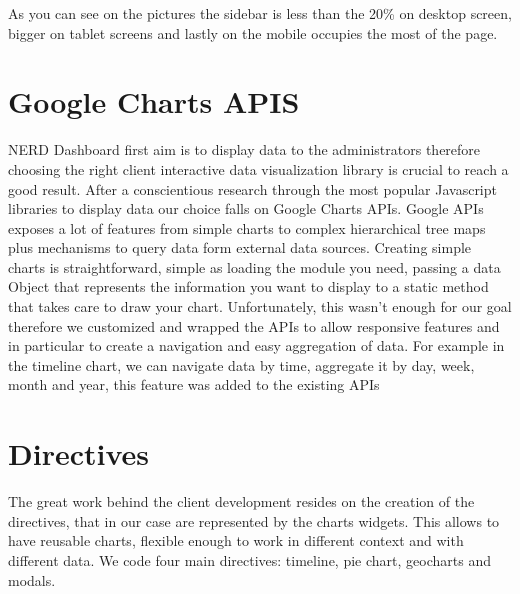 \documentclass[a4paper,13pt]{report}
\begin{document}
As you can see on the pictures the sidebar is less than the 20\% on desktop screen, bigger on tablet screens and lastly on the mobile occupies the most of the page.
\section{Google Charts APIS}
NERD Dashboard first aim is to display data to the administrators therefore choosing the right client interactive data visualization library is crucial to reach a good result.
After a  conscientious research through the most popular Javascript libraries to display data our choice falls on Google Charts APIs.
Google APIs exposes a lot of features from simple charts to complex hierarchical tree maps plus mechanisms to query data form external data sources.
Creating simple charts is straightforward, simple as loading the module you need, passing a data Object that represents the information you want to display to a static method that takes care to draw your chart.
Unfortunately, this wasn't enough for our goal therefore we customized and wrapped the APIs to allow responsive features and in particular to create a navigation and easy aggregation of data. For example in the timeline chart, we can navigate data by time, aggregate it by day, week, month and year, this feature was added to the existing APIs 

\section{Directives}
The great work behind the client development resides on the creation of the directives, that in our case are represented by the charts widgets.
This allows to have reusable charts, flexible enough to work in different context and with different data.
We code four main directives: timeline, pie chart, geocharts and modals.
\end{document}
